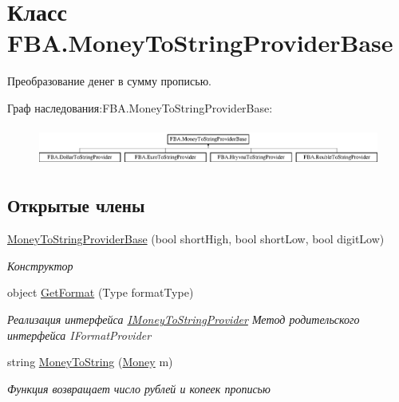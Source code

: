\hypertarget{class_f_b_a_1_1_money_to_string_provider_base}{}\section{Класс F\+B\+A.\+Money\+To\+String\+Provider\+Base}
\label{class_f_b_a_1_1_money_to_string_provider_base}


Преобразование денег в сумму прописью.  


Граф наследования\+:F\+B\+A.\+Money\+To\+String\+Provider\+Base\+:\begin{figure}[H]
\begin{center}
\leavevmode
\includegraphics[height=1.320755cm]{class_f_b_a_1_1_money_to_string_provider_base}
\end{center}
\end{figure}
\subsection*{Открытые члены}
\begin{DoxyCompactItemize}
\item 
\mbox{\hyperlink{class_f_b_a_1_1_money_to_string_provider_base_a9626d1f4d19e788702a237cedb33fa5a}{Money\+To\+String\+Provider\+Base}} (bool short\+High, bool short\+Low, bool digit\+Low)
\begin{DoxyCompactList}\small\item\em Конструктор \end{DoxyCompactList}\item 
object \mbox{\hyperlink{class_f_b_a_1_1_money_to_string_provider_base_a6b63e8303c389688a65c63aede49b4ee}{Get\+Format}} (Type format\+Type)
\begin{DoxyCompactList}\small\item\em Реализация интерфейса \mbox{\hyperlink{interface_f_b_a_1_1_i_money_to_string_provider}{I\+Money\+To\+String\+Provider}} Метод родительского интерфейса I\+Format\+Provider \end{DoxyCompactList}\item 
string \mbox{\hyperlink{class_f_b_a_1_1_money_to_string_provider_base_ac980731799d741d463f089b89e2534ab}{Money\+To\+String}} (\mbox{\hyperlink{struct_f_b_a_1_1_money}{Money}} m)
\begin{DoxyCompactList}\small\item\em Функция возвращает число рублей и копеек прописью \end{DoxyCompactList}\end{DoxyCompactItemize}
